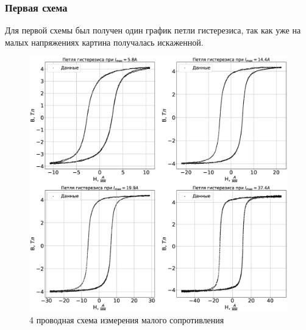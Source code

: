 \documentclass[a4paper,14pt]{extarticle}
\begin{document}
			\subsubsection{Первая схема}
				Для первой схемы был получен один график петли гистерезиса, так как уже на малых напряжениях картина получалась искаженной. 
				\begin{figure}[h!]
					\includegraphics[width=1.0\linewidth]{Lab2_3.eps}
					\caption{4 проводная схема измерения малого сопротивления}
					\label{fig5}
				\end{figure}
				\newline
\end{document}
